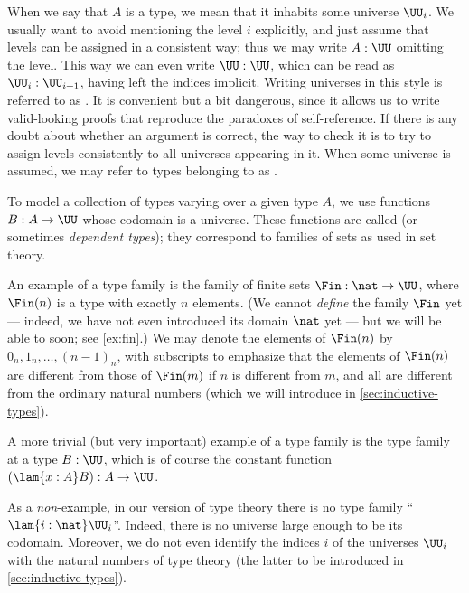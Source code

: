 When we say that $A$ is a type, we mean that it inhabits some universe
$\UU_i$. We usually want to avoid mentioning the level
%
%
%
$i$ explicitly,
and just assume that levels can be assigned in a consistent way; thus we
may write $A:\UU$ omitting the level. This way we can even write
$\UU:\UU$, which can be read as $\UU_i:\UU_{i+1}$, having left the
indices implicit.  Writing universes in this style is referred to as
.
%
It is convenient but a bit dangerous, since it allows us to write valid-looking proofs that reproduce the paradoxes of self-reference.
If there is any doubt about whether an argument is correct, the way to check it is to try to assign levels consistently to all universes appearing in it.
When some universe \UU is assumed, we may refer to types belonging to \UU as .
%
%

To model a collection of types varying over a given type $A$, we use functions $B : A \to \UU$  whose
codomain is a universe. These functions are called
 (or sometimes \emph{dependent types});
%
%
%
%
they correspond to families of sets as used in
set theory.

%
An example of a type family is the family of finite sets $\Fin
: \nat \to \UU$, where $\Fin(n)$ is a type with exactly $n$ elements.
(We cannot \emph{define} the family $\Fin$ yet --- indeed, we have not even introduced its domain $\nat$ yet --- but we will be able to soon; see \cref{ex:fin}.)
We may denote the elements of $\Fin(n)$ by $0_n,1_n,\dots,(n-1)_n$, with subscripts to emphasize that the elements of $\Fin(n)$ are different from those of $\Fin(m)$ if $n$ is different from $m$, and all are different from the ordinary natural numbers (which we will introduce in \cref{sec:inductive-types}).
%

A more trivial (but very important) example of a type family is the  type family
%
%
at a type $B:\UU$, which is of course the constant function $(\lam{x:A} B):A\to\UU$.

As a \emph{non}-example, in our version of type theory there is no type family ``$\lam{i:\nat} \UU_i$''.
Indeed, there is no universe large enough to be its codomain.
Moreover, we do not even identify the indices $i$ of the universes $\UU_i$ with the natural numbers \nat of type theory (the latter to be introduced in \cref{sec:inductive-types}).

